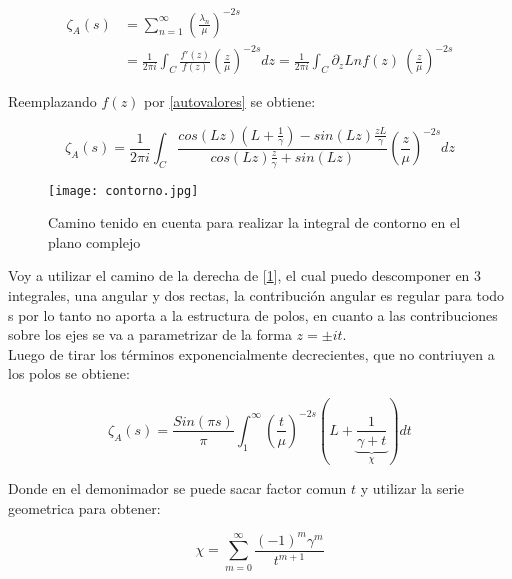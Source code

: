 \begin{equation}
\begin{aligned}
   \zeta _A (s) &=  \sum _{n=1} ^{\infty} \left( \frac{\lambda _n}{\mu} \right) ^{-2s} \\[5pt] &=  
   \frac{1}{2 \pi i} \int _{C} \frac{f'(z)}{f(z)} \left( \frac{z}{\mu} \right) ^{-2s} dz 
   =  \frac{1}{2 \pi i} \int _{C} \partial _z Ln f(z) \ 
	   \left( \frac{z}{\mu} \right) ^{-2s}

\end{aligned}
\label{asd}
\end{equation}

Reemplazando $f(z)$ por  \ref{autovalores} se obtiene:

\begin{equation}
	\zeta _A (s) = 
    \frac{1}{2 \pi i} \int _{C}
    \frac{ cos(L z) \left(L + \frac{1}{\gamma} \right) - sin(L z) \frac{z L}{\gamma}
    }
    {cos(L z) \frac{z}{\gamma} + sin(L z)
    }
    \left( \frac{z}{\mu} \right) ^{-2 s} dz
\end{equation}


\begin{figure}
\centering
\texttt{[image: contorno.jpg]}
\caption{Camino tenido en cuenta para realizar la integral de contorno en el plano complejo}
\label{fig:contorno}
\end{figure}




Voy a utilizar el camino de la derecha de [\ref{fig:contorno}], el cual puedo descomponer en 3 integrales, una angular y dos rectas, la contribución angular es regular para todo s por lo tanto no aporta a la estructura de polos, en cuanto a las contribuciones sobre los ejes se va a parametrizar de la forma $z = \pm i  t$. \\ 


	Luego de tirar los términos exponencialmente decrecientes, que no contriuyen a los polos se obtiene:

\begin{equation}
	\zeta _A (s) = 
    \frac{Sin(\pi s)}{ \pi } 
    \int _1 ^{\infty} 
    \left( \frac{t}{\mu}  \right)^{-2s}
    \left(
    	L + 
	    \underbrace
    	{
		\frac{1}{\gamma + t}   
		} _{\chi} 
	\right)
    dt 
\label{contorno}
\end{equation}

Donde en el demonimador se puede sacar factor comun $t$ y utilizar la serie geometrica para obtener:

\begin{equation}
    \chi =   \sum _{m=0} ^{\infty} \frac{(-1) ^{m} \gamma ^{m} }{t ^{m+1}}
\label{eq:chi}
\end{equation}

